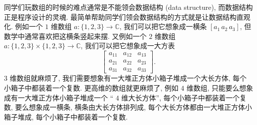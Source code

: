 同学们玩数组的时候的难点通常是不能领会数据结构 (data structure), 而数据结构正是程序设计的灵魂. 最简单帮助同学们领会数据结构的方式就是让数据结构直观化. 例如一个 $1$ 维数组 $a\colon \{1,2,3\}\to\mathbb{C}$, 我们可以把它想象成一横条 $[a_1\,a_2\,a_3]$, 但数学中通常喜欢把这横条竖起来摆. 又例如一个 $2$ 维数组 $a\colon \{1,2,3\}\times\{1,2,3\}\to\mathbb{C}$, 我们可以把它想象成一大方表
\begin{equation*}
    \begin{bmatrix}
        a_{11}&a_{12}&a_{13}\\
        a_{21}&a_{22}&a_{23}\\
        a_{31}&a_{32}&a_{33}
    \end{bmatrix}.
\end{equation*}
$3$ 维数组就麻烦了, 我们需要想象有一大堆正方体小箱子堆成一个大长方体, 每个小箱子中都装着一个复数. 更高维的数组就更麻烦了, 例如 $4$ 维数组, 只能要么想象成有一大堆正方体小箱子堆成一个 `` $4$ 维大长方体'', 每个小箱子中都装着一个复数, 要么想象成一横条, 横条由大长方体排列成, 每个大长方体都由一大堆正方体小箱子堆成, 每个小箱子中都装着一个复数.

